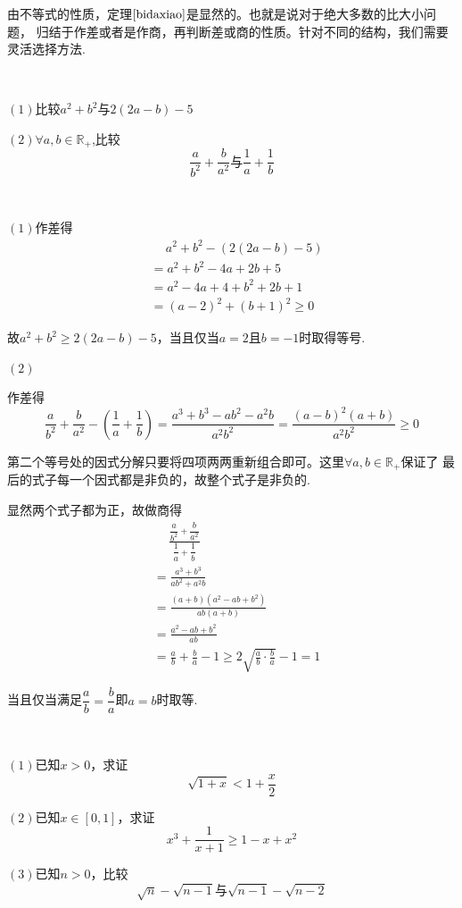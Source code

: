 由不等式的性质，定理$\ref*{bidaxiao}$是显然的。也就是说对于绝大多数的比大小问题，
归结于作差或者是作商，再判断差或商的性质。针对不同的结构，我们需要灵活选择方法.
\begin{example}
    \ 

    $(1)$比较$a^2+b^2$与$2(2a-b)-5$

    $(2)$$\forall a,b\in\mathbb{R}_+$,比较
    \[\frac{a}{b^2}+\frac{b}{a^2}\text{与}\frac{1}{a}+\frac{1}{b}\]
\end{example}
\begin{jie}
    \ 

    $(1)$作差得
    \begin{align*}
    &\quad\  a^2+b^2-(2(2a-b)-5)\\
    &=a^2+b^2-4a+2b+5\\
    &=a^2-4a+4+b^2+2b+1\\
    &=(a-2)^2+(b+1)^2 \geq 0
    \end{align*}
    
    故$a^2+b^2\geq 2(2a-b)-5$，当且仅当$a=2$且$b=-1$时取得等号.

    $(2)$
    \begin{way1}
    作差得
    \[\frac{a}{b^2}+\frac{b}{a^2}-(\frac{1}{a}+\frac{1}{b})
    =\frac{a^3+b^3-ab^2-a^2b}{a^2b^2}=\frac{(a-b)^2(a+b)}{a^2b^2}\geq0\]

    第二个等号处的因式分解只要将四项两两重新组合即可。这里$\forall a,b\in\mathbb{R}_+$保证了
    最后的式子每一个因式都是非负的，故整个式子是非负的.
    \end{way1}
    \begin{way2}
    显然两个式子都为正，故做商得
    \begin{align*}
    &\quad\ \frac{\dfrac{a}{b^2}+\dfrac{b}{a^2}}{\dfrac{1}{a}+\dfrac{1}{b}}\\
    &=\frac{a^3+b^3}{ab^2+a^2b}\\
    &=\frac{(a+b)(a^2-ab+b^2)}{ab(a+b)}\\
    &=\frac{a^2-ab+b^2}{ab}\\
    &=\frac{a}{b}+\frac{b}{a}-1 \geq 2\sqrt{\frac{a}{b}\cdot \frac{b}{a}}-1=1
    \end{align*}

    当且仅当满足$\dfrac{a}{b}=\dfrac{b}{a}$即$a=b$时取等.
    \end{way2}
\end{jie}
\begin{example}
    \ 

    $(1)$已知$x>0$，求证\[\sqrt{1+x}<1+\dfrac{x}{2}\]
    
    $(2)$已知$x\in[0,1]$，求证\[x^3+\frac{1}{x+1}\geq 1-x+x^2\]

    $(3)$已知$n>0$，比较\[\sqrt{n}-\sqrt{n-1}\text{与}\sqrt{n-1}-\sqrt{n-2}\]
\end{example}






